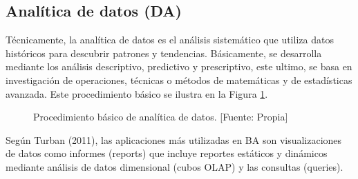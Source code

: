 \documentclass[11pt,titlepage]{report}
\begin{document}
\subsection{Analítica de datos (DA)}
Técnicamente, la analítica de datos es el análisis sistemático que utiliza datos históricos para descubrir patrones y tendencias. Básicamente, se desarrolla mediante los análisis descriptivo, predictivo y prescriptivo, este ultimo, se basa en investigación de operaciones, técnicas o métodos de matemáticas y de estadísticas avanzada. Este procedimiento básico se ilustra en la Figura \ref{fig: analitica}.

\begin{figure}[h]
	\centering
	\caption{Procedimiento básico de analítica de datos. [Fuente: Propia]} \label{fig: analitica}	
\end{figure}

Según Turban (2011), las aplicaciones más utilizadas en BA son visualizaciones de datos como informes (reports) que incluye reportes estáticos y dinámicos mediante análisis de datos dimensional (cubos OLAP) y las consultas (queries).
\end{document}
